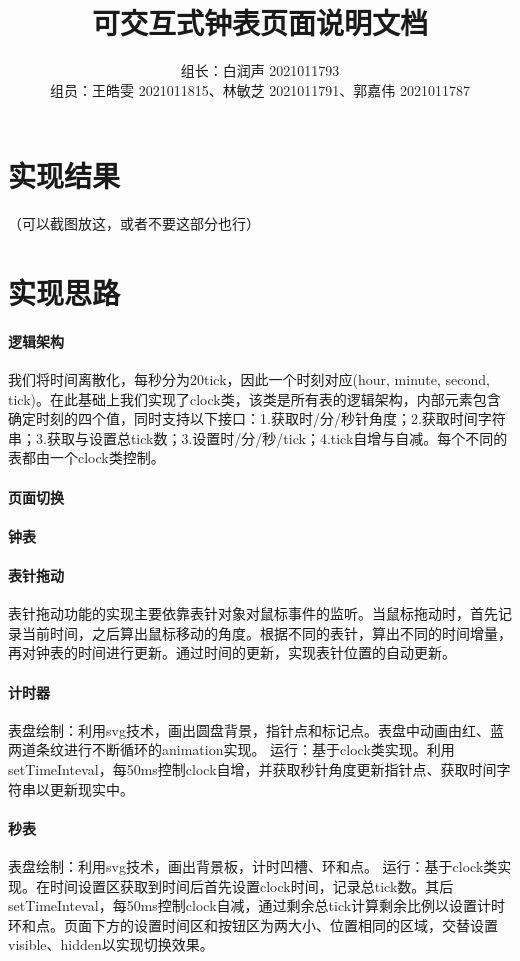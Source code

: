 \documentclass[UTF8]{ctexart}
\title{可交互式钟表页面说明文档}
\author{组长：白润声 2021011793 \\ 组员：王皓雯 2021011815、林敏芝 2021011791、郭嘉伟 2021011787}
\date{}
\begin{document}
	\maketitle
	\section{实现结果}
	（可以截图放这，或者不要这部分也行）
	\section{实现思路} %
	\paragraph{逻辑架构}
	我们将时间离散化，每秒分为20tick，因此一个时刻对应(hour, minute, second, tick)。在此基础上我们实现了clock类，该类是所有表的逻辑架构，内部元素包含确定时刻的四个值，同时支持以下接口：1.获取时/分/秒针角度；2.获取时间字符串；3.获取与设置总tick数；3.设置时/分/秒/tick；4.tick自增与自减。每个不同的表都由一个clock类控制。
	\paragraph{页面切换}
	
	\paragraph{钟表}
	
	\paragraph{表针拖动}
	表针拖动功能的实现主要依靠表针对象对鼠标事件的监听。当鼠标拖动时，首先记录当前时间，之后算出鼠标移动的角度。根据不同的表针，算出不同的时间增量，再对钟表的时间进行更新。通过时间的更新，实现表针位置的自动更新。
	
	\paragraph{计时器}
	表盘绘制：利用svg技术，画出圆盘背景，指针点和标记点。表盘中动画由红、蓝两道条纹进行不断循环的animation实现。
	运行：基于clock类实现。利用setTimeInteval，每50ms控制clock自增，并获取秒针角度更新指针点、获取时间字符串以更新现实中。
	\paragraph{秒表}
	表盘绘制：利用svg技术，画出背景板，计时凹槽、环和点。
	运行：基于clock类实现。在时间设置区获取到时间后首先设置clock时间，记录总tick数。其后setTimeInteval，每50ms控制clock自减，通过剩余总tick计算剩余比例以设置计时环和点。页面下方的设置时间区和按钮区为两大小、位置相同的区域，交替设置visible、hidden以实现切换效果。
\end{document}
